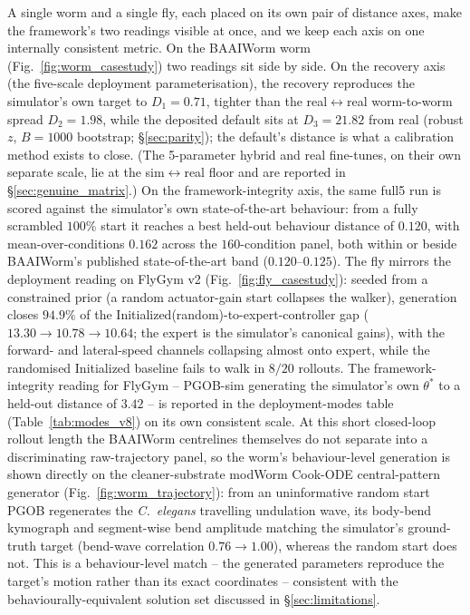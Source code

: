 \documentclass[11pt]{article}
\begin{document}
A single worm and a single fly, each placed on its own pair of distance axes, make the framework's two readings visible at once, and we keep each axis on one internally consistent metric. On the BAAIWorm worm (Fig.~\ref{fig:worm_casestudy}) two readings sit side by side. On the recovery axis (the five-scale deployment parameterisation), the recovery reproduces the simulator's own target to $D_1{=}0.71$, tighter than the real$\leftrightarrow$real worm-to-worm spread $D_2{=}1.98$, while the deposited default sits at $D_3{=}21.82$ from real (robust $z$, $B{=}1000$ bootstrap; \S\ref{sec:parity}); the default's distance is what a calibration method exists to close. (The 5-parameter hybrid and real fine-tunes, on their own separate scale, lie at the sim$\leftrightarrow$real floor and are reported in \S\ref{sec:genuine_matrix}.) On the framework-integrity axis, the same full5 run is scored against the simulator's own state-of-the-art behaviour: from a fully scrambled $100\%$ start it reaches a best held-out behaviour distance of $0.120$, with mean-over-conditions $0.162$ across the $160$-condition panel, both within or beside BAAIWorm's published state-of-the-art band ($0.120$--$0.125$). The fly mirrors the deployment reading on FlyGym v2 (Fig.~\ref{fig:fly_casestudy}): seeded from a constrained prior (a random actuator-gain start collapses the walker), generation closes $94.9\%$ of the Initialized(random)-to-expert-controller gap ($13.30\to10.78\to10.64$; the expert is the simulator's canonical gains), with the forward- and lateral-speed channels collapsing almost onto expert, while the randomised Initialized baseline fails to walk in $8/20$ rollouts. The framework-integrity reading for FlyGym -- PGOB-sim generating the simulator's own $\theta^{*}$ to a held-out distance of $3.42$ -- is reported in the deployment-modes table (Table~\ref{tab:modes_v8}) on its own consistent scale. At this short closed-loop rollout length the BAAIWorm centrelines themselves do not separate into a discriminating raw-trajectory panel, so the worm's behaviour-level generation is shown directly on the cleaner-substrate modWorm Cook-ODE central-pattern generator (Fig.~\ref{fig:worm_trajectory}): from an uninformative random start PGOB regenerates the \emph{C.\ elegans} travelling undulation wave, its body-bend kymograph and segment-wise bend amplitude matching the simulator's ground-truth target (bend-wave correlation $0.76\to1.00$), whereas the random start does not. This is a behaviour-level match -- the generated parameters reproduce the target's motion rather than its exact coordinates -- consistent with the behaviourally-equivalent solution set discussed in \S\ref{sec:limitations}.
\end{document}
